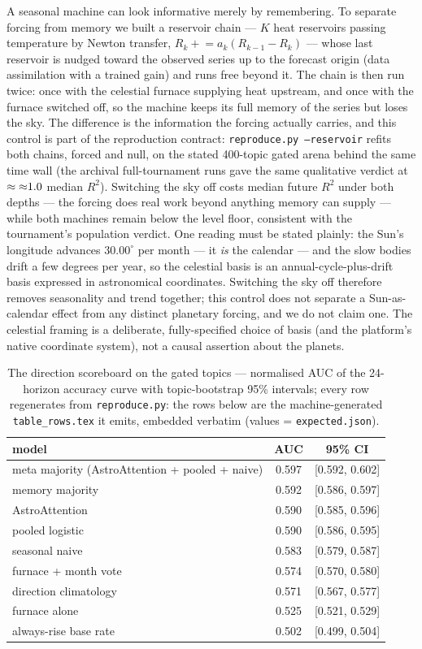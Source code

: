 \documentclass[11pt]{artaquest}
\begin{document}
A seasonal machine can look informative merely by remembering. To separate forcing from memory we
built a reservoir chain --- $K$ heat reservoirs passing temperature by Newton transfer,
$R_k \mathrel{+}= a_k(R_{k-1}-R_k)$ --- whose last reservoir is nudged toward the observed series
up to the forecast origin (data assimilation with a trained gain) and runs free beyond it. The
chain is then run twice: once with the celestial furnace supplying heat upstream, and once with
the furnace switched off, so the machine keeps its full memory of the series but loses the sky.
The difference is the information the forcing actually carries, and this control is part of the
reproduction contract: \texttt{reproduce.py --reservoir} refits both chains, forced and null,
on the stated 400-topic gated arena behind the same time wall (the archival full-tournament runs
gave the same qualitative verdict at $\approx{\approx}1.0$ median $R^2$). \resNumbers{}
Switching the sky off costs median future $R^2$ under both depths --- the forcing does real work
beyond anything memory can supply --- while both machines remain below the level floor,
consistent with the tournament's population verdict. One reading must be
stated plainly: the Sun's longitude advances $30.00^{\circ}$ per month --- it \emph{is} the
calendar --- and the slow bodies drift a few degrees per year, so the celestial basis is an
annual-cycle-plus-drift basis expressed in astronomical coordinates. Switching the sky off
therefore removes seasonality and trend together; this control does not separate a Sun-as-calendar
effect from any distinct planetary forcing, and we do not claim one. The celestial framing is a
deliberate, fully-specified choice of basis (and the platform's native coordinate system), not a
causal assertion about the planets.

\begin{table}[t]\centering\small
\caption{The direction scoreboard on the \nTopicsDir{} gated topics --- normalised AUC of the
24-horizon accuracy curve with topic-bootstrap 95\% intervals; every row regenerates from
\texttt{reproduce.py}: the rows below are the machine-generated \texttt{table\_rows.tex} it emits, embedded verbatim (values = \texttt{expected.json}).}\label{tab:scoreboard}
\begin{tabular}{lcc}
\hline
model & AUC & 95\% CI \\
\hline
meta majority (AstroAttention + pooled + naive) & 0.597 & [0.592, 0.602] \\
memory majority & 0.592 & [0.586, 0.597] \\
AstroAttention & 0.590 & [0.585, 0.596] \\
pooled logistic & 0.590 & [0.586, 0.595] \\
seasonal naive & 0.583 & [0.579, 0.587] \\
furnace + month vote & 0.574 & [0.570, 0.580] \\
direction climatology & 0.571 & [0.567, 0.577] \\
furnace alone & 0.525 & [0.521, 0.529] \\
always-rise base rate & 0.502 & [0.499, 0.504] \\
\hline
\end{tabular}
\end{table}
\end{document}
